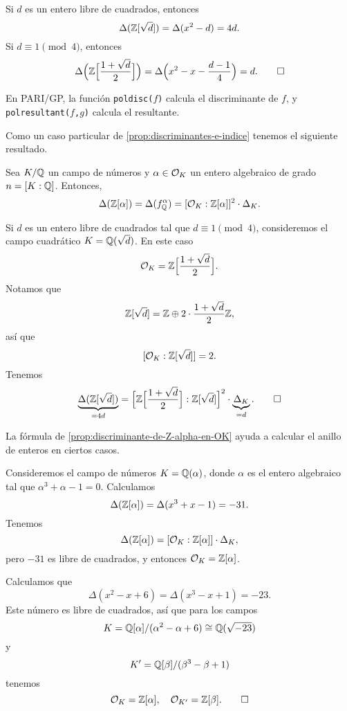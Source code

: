 \begin{ejemplo}
  Si $d$ es un entero libre de cuadrados, entonces
  $$\Delta (\mathbb{Z} [\sqrt{d}]) = \Delta (x^2 - d) = 4d.$$
  Si $d \equiv 1 \pmod{4}$, entonces
  \[ \Delta \Bigl(\mathbb{Z} \Bigl[\frac{1 + \sqrt{d}}{2}\Bigr]\Bigr)
   = \Delta \Bigl(x^2 - x - \frac{d-1}{4}\Bigr) = d. \qedhere \]
\end{ejemplo}

En PARI/GP, la función \texttt{poldisc($f$)} calcula el discriminante de $f$,
y \texttt{polresultant($f$,$g$)} calcula el resultante.

\vspace{1em}

Como un caso particular de \ref{prop:discriminantes-e-indice} tenemos
el siguiente resultado.

\begin{proposicion}
  \label{prop:discriminante-de-Z-alpha-en-OK}
  Sea $K/\mathbb{Q}$ un campo de números y $\alpha \in \mathcal{O}_K$ un entero algebraico de
  grado $n = [K : \mathbb{Q}]$. Entonces,
  \[ \Delta (\mathbb{Z} [\alpha]) = \Delta (f^\alpha_{\mathbb{Q}}) =
     [\mathcal{O}_K : \mathbb{Z} [\alpha]]^2 \cdot \Delta_K. \]
\end{proposicion}

\begin{ejemplo}
  Si $d$ es un entero libre de cuadrados tal que $d \equiv 1 \pmod{4}$,
  consideremos el campo cuadrático $K = \mathbb{Q} (\sqrt{d})$. En este caso
  $$\mathcal{O}_K = \mathbb{Z} \Bigl[\frac{1+\sqrt{d}}{2}\Bigr].$$
  Notamos que
  $$\mathbb{Z} [\sqrt{d}] = \mathbb{Z} \oplus 2\cdot \frac{1+\sqrt{d}}{2}\mathbb{Z},$$
  así que
  $$[\mathcal{O}_K : \mathbb{Z} [\sqrt{d}]] = 2.$$
  Tenemos
  \[ \underbrace{\Delta (\mathbb{Z} [\sqrt{d}])}_{= 4d} =
  \Bigl[\mathbb{Z} \Bigl[\frac{1+\sqrt{d}}{2}\Bigr] : \mathbb{Z} [\sqrt{d}] \Bigr]^2 \cdot
  \underbrace{\Delta_K}_{=d}. \qedhere \]
\end{ejemplo}

La fórmula de \ref{prop:discriminante-de-Z-alpha-en-OK} ayuda a calcular
el anillo de enteros en ciertos casos.

\begin{ejemplo}
  Consideremos el campo de números $K = \mathbb{Q} (\alpha)$, donde $\alpha$
  es el entero algebraico tal que $\alpha^3 + \alpha - 1 = 0$. Calculamos
  $$\Delta (\mathbb{Z} [\alpha]) = \Delta (x^3 + x - 1) = -31.$$
  Tenemos
  $$\Delta (\mathbb{Z} [\alpha]) = [\mathcal{O}_K : \mathbb{Z} [\alpha]] \cdot \Delta_K,$$
  pero $-31$ es libre de cuadrados, y entonces $\mathcal{O}_K = \mathbb{Z} [\alpha]$.
\end{ejemplo}

\begin{ejemplo}
  Calculamos que
  $$\Delta (x^2 - x + 6) = \Delta (x^3 - x + 1) = -23.$$
  Este número es libre de cuadrados, así que para los campos
  $$K = \mathbb{Q} [\alpha]/(\alpha^2 - \alpha + 6) \cong \mathbb{Q} (\sqrt{-23})$$
  y
  $$K' = \mathbb{Q} [\beta]/(\beta^3 - \beta + 1)$$
  tenemos
  \[ \mathcal{O}_K = \mathbb{Z} [\alpha], \quad \mathcal{O}_{K'} = \mathbb{Z} [\beta]. \qedhere \]
\end{ejemplo}

